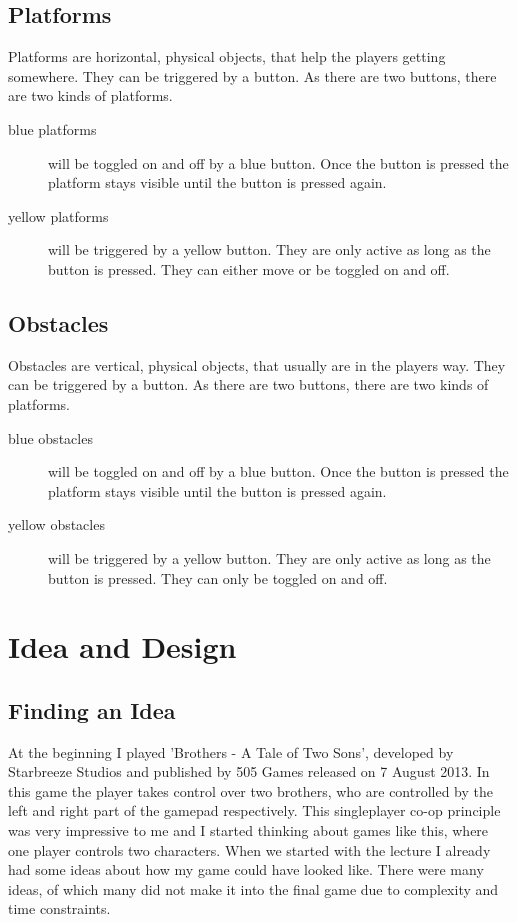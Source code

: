 \documentclass[12pt,a4paper]{scrartcl}
\begin{document}
\subsection*{Platforms}
Platforms are horizontal, physical objects, that help the players getting somewhere. They can be triggered by a button. As there are two buttons, there are two kinds of platforms. 
\begin{description}
\item[blue platforms] will be toggled on and off by a blue button. Once the button is pressed the platform stays visible until the button is pressed again.  
\item [yellow platforms] will be triggered by a yellow button. They are only active as long as the button is pressed. They can either move or be toggled on and off.
\end{description}

\subsection*{Obstacles}
Obstacles are vertical, physical objects, that usually are in the players way. They can be triggered by a button. As there are two buttons, there are two kinds of platforms. 
\begin{description}
\item[blue obstacles] will be toggled on and off by a blue button. Once the button is pressed the platform stays visible until the button is pressed again.  
\item [yellow obstacles] will be triggered by a yellow button. They are only active as long as the button is pressed. They can only be toggled on and off.
\end{description}

\newpage

\section*{Idea and Design}

\subsection*{Finding an Idea}
At the beginning I played 'Brothers - A Tale of Two Sons', developed by Starbreeze Studios and published by 505 Games released on 7 August 2013. In this game the player takes control over two brothers, who are controlled by the left and right part of the gamepad respectively. This singleplayer co-op principle was very impressive to me and I started thinking about games like this, where one player controls two characters. When we started with the lecture I already had some ideas about how my game could have looked like. There were many ideas, of which many did not make it into the final game due to complexity and time constraints.
 
\end{document}
